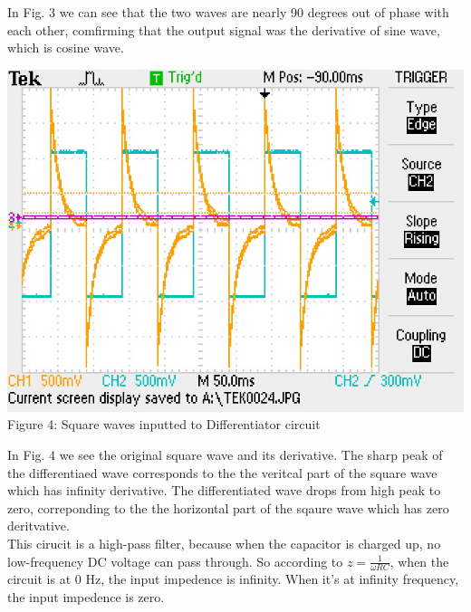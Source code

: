 \documentclass[]{article}
\begin{document}
	In Fig. 3 we can see that the two waves are nearly 90 degrees out of phase with each other, comfirming that the output signal was the derivative of sine wave, which is cosine wave.
		\begin{center}
			\includegraphics[scale=0.9]{f_square}\\
			Figure 4: Square waves inputted to Differentiator circuit
		\end{center}
	In Fig. 4 we see the original square wave and its derivative. The sharp peak of the differentiaed wave corresponds to the the veritcal part of the square wave which has infinity derivative. The differentiated wave drops from high peak to zero, correponding to the the horizontal part of the sqaure wave which has zero deritvative.\\
	This cirucit is a high-pass filter, because when the capacitor is charged up, no low-frequency DC voltage can pass through. So according to $z=\frac{1}{\omega RC}$, when the circuit is at 0 Hz, the input impedence is infinity. When it's at infinity frequency, the input impedence is zero. 
\end{document}
